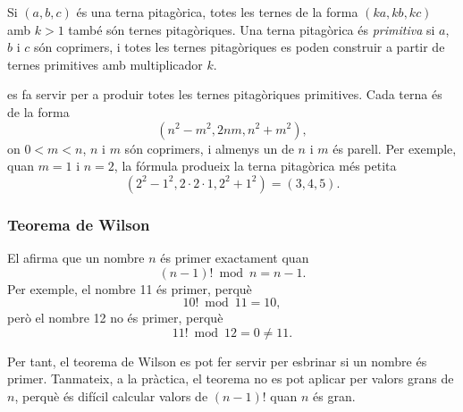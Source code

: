 Si $(a,b,c)$ és una terna pitagòrica, totes les ternes de la forma
$(ka,kb,kc)$ amb $k>1$ també són ternes pitagòriques. Una terna
pitagòrica és \emph{primitiva} si $a$, $b$ i $c$ són coprimers, i
totes les ternes pitagòriques es poden construir a partir de ternes
primitives amb multiplicador $k$.

 es fa servir per a produir totes les ternes pitagòriques primitives. Cada terna és de la forma
\[(n^2-m^2,2nm,n^2+m^2),\]
on $0<m<n$, $n$ i $m$ són coprimers, i almenys un de $n$ i $m$ és parell. Per
exemple, quan $m=1$ i $n=2$, la fórmula produeix la terna pitagòrica més petita
\[(2^2-1^2,2\cdot2\cdot1,2^2+1^2)=(3,4,5).\]


\subsubsection{Teorema de Wilson}


El  %
afirma que un nombre $n$ és primer exactament quan
\[(n-1)! \bmod n = n-1.\]
Per exemple, el nombre 11 és primer, perquè
\[10! \bmod 11 = 10,\]
però el nombre 12 no és primer, perquè
\[11! \bmod 12 = 0 \neq 11.\]


Per tant, el teorema de Wilson es pot fer servir per esbrinar si un
nombre és primer. Tanmateix, a la pràctica, el teorema no es pot
aplicar per valors grans de $n$, perquè és difícil calcular valors de
$(n-1)!$ quan $n$ és gran.




